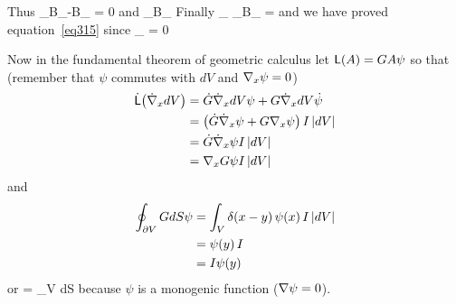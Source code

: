Thus
\be
\limeps{}\int_{B_{\infty}-B_{\tau}} = 0
\ee
and
\be
\min{} \le \limeps{}\int_{B_{\tau}} \le \max{}
\ee
Finally
\be
\lim_{\tau{}} \limeps{}\int_{B_{\tau}} = 
\ee
and we have proved equation~\ref{eq315} since 
\be
\lim_{\tau{}}  = 0
\ee

Now in the fundamental theorem of geometric calculus let ${\mathsf{L}}\!\left ({A}\right ) = GA\psi$ so that (remember that $\psi$ commutes with $dV$ and ${\mathbf \nabla}_{x}\psi = 0$)
\begin{align}
{\dot{\mathsf{L}}}\!\left ({\dot{{\mathbf \nabla}}_{x}dV}\right ) & = \dot{G}\dot{{\mathbf \nabla}}_{x}dV\psi+G\dot{{\mathbf \nabla}}_{x}dV\dot{\psi} \nonumber \\
                                     & = \left ( {\dot{G}\dot{{\mathbf \nabla}}_{x}\psi+G{\mathbf \nabla}_{x}\psi} \right ) I\left | {dV} \right | \nonumber \\
                                     & = \dot{G}\dot{{\mathbf \nabla}}_{x}\psi I\left | {dV} \right | \nonumber \\
                                     & = {{\mathbf \nabla}}_{x}G\psi I\left | {dV} \right |
\end{align}
and 
\begin{align}
\oint_{\partial V} GdS\psi & = \int_{V} {\delta}\!\left ({x-y}\right ){\psi}\!\left ({x}\right ) I\left | {dV} \right | \nonumber \\
                           & = {\psi}\!\left ({y}\right ) I \nonumber \\
                           & = I{\psi}\!\left ({y}\right )
\end{align}
or
\be
{} = \oint_{\partial V} dS
\ee
because $\psi$ is a monogenic function (${\mathbf \nabla}\psi = 0$).
